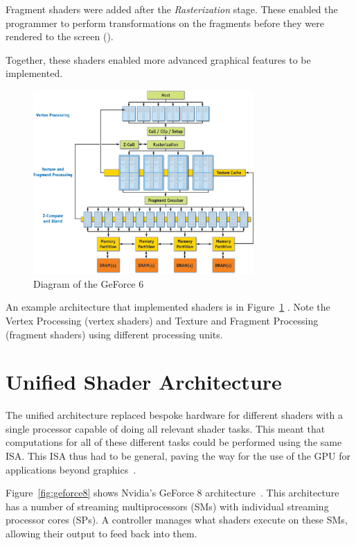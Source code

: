 Fragment shaders were added after the \textit{Rasterization} stage.
These enabled the programmer to perform transformations on the fragments
before they were rendered to the screen (\cite{lsu}).

Together, these shaders enabled more advanced graphical features to
be implemented.

\begin{figure}[h]
    \centering
    \includegraphics[width=0.75\textwidth]{assets/30_geforce6_03.jpg}
    \caption{Diagram of the GeForce 6 }
    \label{fig:geforce6}
\end{figure}

An example architecture that implemented shaders is in Figure~\ref{fig:geforce6} \cite{nvidiaChapterGeForce}.
Note the Vertex Processing (vertex shaders) and Texture and Fragment Processing
(fragment shaders) using different processing units.

\section{Unified Shader Architecture}

The unified architecture replaced bespoke hardware for different shaders with
a single processor capable of doing all relevant shader tasks.
This meant that computations for all of these different tasks could be performed
using the same ISA. This ISA thus had to be general, paving the way for
the use of the GPU for applications beyond graphics~\cite{parojModernUnification}.

Figure~\ref{fig:geforce8} shows Nvidia's GeForce 8 architecture~\cite{mcclanahan2010history}. This architecture
has a number of streaming multiprocessors (SMs) with individual streaming processor cores
(SPs). A controller manages what shaders execute on these SMs, allowing their output
to feed back into them.

